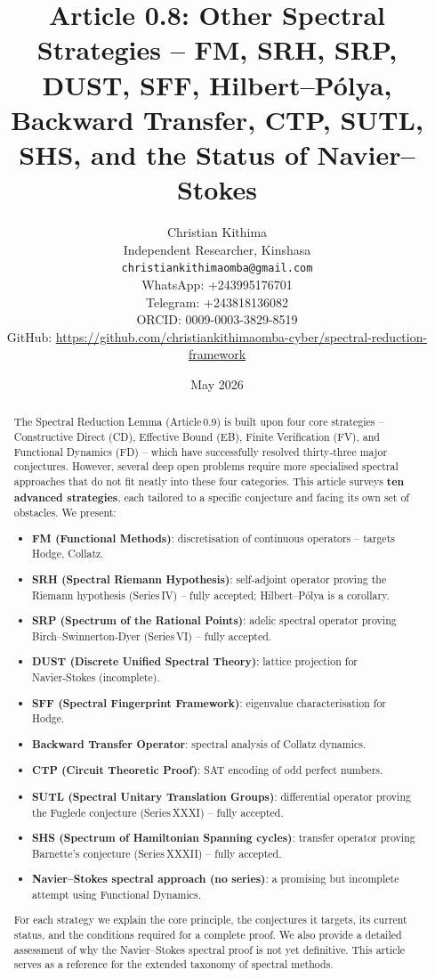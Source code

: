 \documentclass[11pt,a4paper]{article}
\title{Article 0.8: Other Spectral Strategies – FM, SRH, SRP, DUST, SFF, Hilbert–Pólya, Backward Transfer, CTP, SUTL, SHS, and the Status of Navier–Stokes}
\author{Christian Kithima \\
Independent Researcher, Kinshasa \\
\texttt{christiankithimaomba@gmail.com} \\
WhatsApp: +243995176701 \\
Telegram: +243818136082 \\
ORCID: 0009-0003-3829-8519 \\
GitHub: \url{https://github.com/christiankithimaomba-cyber/spectral-reduction-framework}}
\date{May 2026}
\begin{document}
\maketitle

\begin{abstract}
The Spectral Reduction Lemma (Article 0.9) is built upon four core strategies – Constructive Direct (CD), Effective Bound (EB), Finite Verification (FV), and Functional Dynamics (FD) – which have successfully resolved thirty‑three major conjectures. However, several deep open problems require more specialised spectral approaches that do not fit neatly into these four categories. This article surveys \textbf{ten advanced strategies}, each tailored to a specific conjecture and facing its own set of obstacles. We present:
\begin{itemize}
\item \textbf{FM (Functional Methods)}: discretisation of continuous operators – targets Hodge, Collatz.
\item \textbf{SRH (Spectral Riemann Hypothesis)}: self‑adjoint operator proving the Riemann hypothesis (Series IV) – fully accepted; Hilbert–Pólya is a corollary.
\item \textbf{SRP (Spectrum of the Rational Points)}: adelic spectral operator proving Birch–Swinnerton‑Dyer (Series VI) – fully accepted.
\item \textbf{DUST (Discrete Unified Spectral Theory)}: lattice projection for Navier‑Stokes (incomplete).
\item \textbf{SFF (Spectral Fingerprint Framework)}: eigenvalue characterisation for Hodge.
\item \textbf{Backward Transfer Operator}: spectral analysis of Collatz dynamics.
\item \textbf{CTP (Circuit Theoretic Proof)}: SAT encoding of odd perfect numbers.
\item \textbf{SUTL (Spectral Unitary Translation Groups)}: differential operator proving the Fuglede conjecture (Series XXXI) – fully accepted.
\item \textbf{SHS (Spectrum of Hamiltonian Spanning cycles)}: transfer operator proving Barnette's conjecture (Series XXXII) – fully accepted.
\item \textbf{Navier–Stokes spectral approach (no series)}: a promising but incomplete attempt using Functional Dynamics.
\end{itemize}
For each strategy we explain the core principle, the conjectures it targets, its current status, and the conditions required for a complete proof. We also provide a detailed assessment of why the Navier–Stokes spectral proof is not yet definitive. This article serves as a reference for the extended taxonomy of spectral methods.
\end{abstract}
\end{document}
